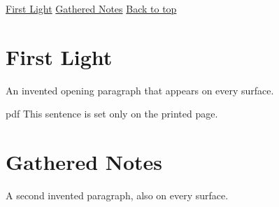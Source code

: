 \documentclass{article}
\begin{document}
\begin{nav}
\href{#first-light}{First Light} \href{#gathered-notes}{Gathered Notes} \href{#top}{Back to top}
\end{nav}

\section*{First Light}

An invented opening paragraph that appears on every surface.

\begin{ifbackend}{pdf}
This sentence is set only on the printed page.
\end{ifbackend}

\section*{Gathered Notes}

A second invented paragraph, also on every surface.

\begin{nav}[label = Return to top, pin = bottom right, offset = 1.5em, reveal = 300px]
\href{#top}{}
\end{nav}
\end{document}
